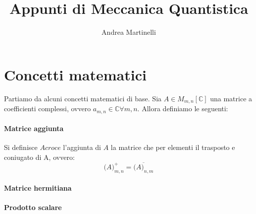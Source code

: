 \documentclass[]{article}
\title{Appunti di Meccanica Quantistica}
\author{Andrea Martinelli}
\begin{document}
\maketitle

\begin{abstract}
\end{abstract}



\section{Concetti matematici}
Partiamo da alcuni concetti matematici di base. Sia $A \in M_{m,n}[ \mathbb{C}]$ una matrice a coefficienti complessi, ovvero $a_{m,n} \in \mathbb{C} \forall m,n$. Allora definiamo le seguenti:
\paragraph{Matrice aggiunta}
Si definisce $Acroce$ l'aggiunta di $A$ la matrice che per elementi il trasposto e coniugato di A, ovvero:
\begin{equation}
	\big(A\big)^+_{m,n} = \overline{\big(A\big)_{n,m}}
\end{equation}
\paragraph{Matrice hermitiana}
\paragraph{Prodotto scalare}
\end{document}
